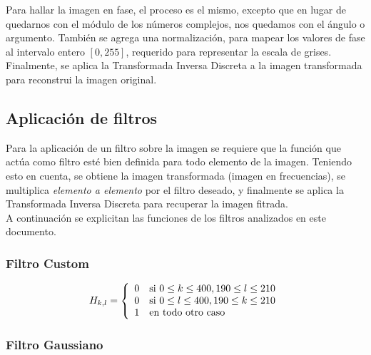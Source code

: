 \documentclass[twocolumn,a4paper,10pt]{article}
\begin{document}
Para hallar la imagen en fase, el proceso es el mismo, excepto que en lugar de quedarnos con el m\'odulo de los n\'umeros complejos, nos quedamos con el 
\'angulo o argumento. Tambi\'en se agrega una normalizaci\'on, para mapear los valores de fase al intervalo entero $[0, 255]$, 
requerido para representar la escala de grises.\\

Finalmente, se aplica la Transformada Inversa Discreta a la imagen transformada para reconstrui la imagen original.\\

\subsection{Aplicaci\'on de filtros}

Para la aplicaci\'on de un filtro sobre la imagen se requiere que la funci\'on que act\'ua como filtro est\'e bien definida para todo elemento de la imagen.
Teniendo esto en cuenta, se obtiene la imagen transformada (imagen en frecuencias), se multiplica \textit{elemento a elemento} por el filtro deseado, y 
finalmente se aplica la Transformada Inversa Discreta para recuperar la imagen fitrada. \\

A continuaci\'on se explicitan las funciones de los filtros analizados en este documento. \\

\subsubsection{Filtro Custom}

\begin{equation}
    H_{k,l} = \left\{
                    \begin{array}{c l}
                        0 & \mbox{si } 0 \leq k \leq 400, 190 \leq l \leq 210\\
                        0 & \mbox{si } 0 \leq l \leq 400, 190 \leq k \leq 210\\
                        1 & \mbox{en todo otro caso}
                    \end{array}               
               \right.
\end{equation}

\subsubsection{Filtro Gaussiano}
\end{document}

